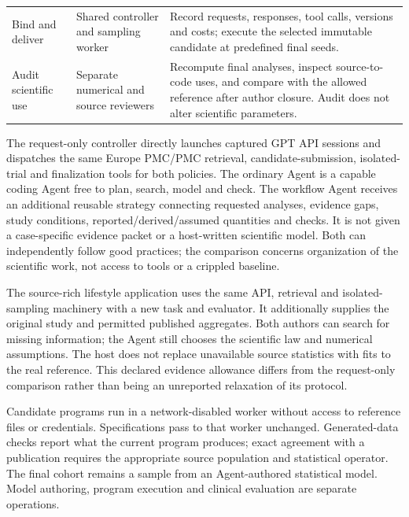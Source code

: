 \documentclass[11pt,letterpaper]{article}
\begin{document}
\begin{xltabular}{\linewidth}{@{}>{\raggedright\arraybackslash}X>{\raggedright\arraybackslash}X>{\raggedright\arraybackslash}X@{}}
Bind and deliver & Shared controller and sampling worker & Record requests, responses, tool calls, versions and costs; execute the selected immutable candidate at predefined final seeds. \\

Audit scientific use & Separate numerical and source reviewers & Recompute final analyses, inspect source-to-code uses, and compare with the allowed reference after author closure. Audit does not alter scientific parameters. \\

\end{xltabular}

\endgroup

The request-only controller directly launches captured GPT API sessions and dispatches the same Europe PMC/\allowbreak{}PMC retrieval, candidate-submission, isolated-trial and finalization tools for both policies. The ordinary Agent is a capable coding Agent free to plan, search, model and check. The workflow Agent receives an additional reusable strategy connecting requested analyses, evidence gaps, study conditions, reported/\allowbreak{}derived/\allowbreak{}assumed quantities and checks. It is not given a case-specific evidence packet or a host-written scientific model. Both can independently follow good practices; the comparison concerns organization of the scientific work, not access to tools or a crippled baseline.


The source-rich lifestyle application uses the same API, retrieval and isolated-sampling machinery with a new task and evaluator. It additionally supplies the original study and permitted published aggregates. Both authors can search for missing information; the Agent still chooses the scientific law and numerical assumptions. The host does not replace unavailable source statistics with fits to the real reference. This declared evidence allowance differs from the request-only comparison rather than being an unreported relaxation of its protocol.


Candidate programs run in a network-disabled worker without access to reference files or credentials. Specifications pass to that worker unchanged. Generated-data checks report what the current program produces; exact agreement with a publication requires the appropriate source population and statistical operator. The final cohort remains a sample from an Agent-authored statistical model. Model authoring, program execution and clinical evaluation are separate operations.
\end{document}
